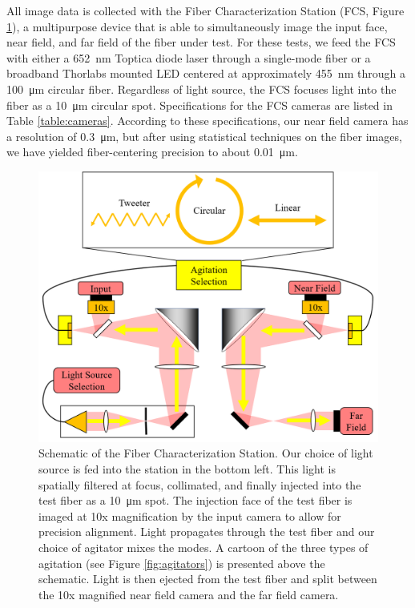 \documentclass[twocolumn]{emulateapj}
\begin{document}
All image data is collected with the Fiber Characterization Station (FCS, Figure \ref{fig:fcs}), a multipurpose device that is able to simultaneously image the input face, near field, and far field of the fiber under test. For these tests, we feed the FCS with either a \SI{652}{\nano\meter} Toptica diode laser through a single-mode fiber or a broadband Thorlabs mounted LED centered at approximately \SI{455}{\nano\meter} through a \SI{100}{\micro\meter} circular fiber. Regardless of light source, the FCS focuses light into the fiber as a \SI{10}{\micro\meter} circular spot. Specifications for the FCS cameras are listed in Table \ref{table:cameras}. According to these specifications, our near field camera has a resolution of \SI{0.3}{\micro\meter}, but after using statistical techniques on the fiber images, we have yielded fiber-centering precision to about \SI{0.01}{\micro\meter}. 

\begin{figure}
\centering
	\includegraphics[width=\columnwidth]{images/fcs_schematic.png}
	\caption{Schematic of the Fiber Characterization Station. Our choice of light source is fed into the station in the bottom left. This light is spatially filtered at focus, collimated, and finally injected into the test fiber as a \SI{10}{\micro\meter} spot. The injection face of the test fiber is imaged at 10x magnification by the input camera to allow for precision alignment. Light propagates through the test fiber and our choice of agitator mixes the modes. A cartoon of the three types of agitation (see Figure \ref{fig:agitators}) is presented above the schematic. Light is then ejected from the test fiber and split between the 10x magnified near field camera and the far field camera.}
\label{fig:fcs}
\end{figure}
\end{document}
